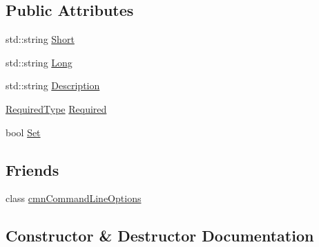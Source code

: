\subsection*{Public Attributes}
\begin{DoxyCompactItemize}
\item 
std\+::string \hyperlink{classcmn_command_line_options_1_1_option_base_aa7799a5119c4018ddb5e10eebbde2d16}{Short}
\item 
std\+::string \hyperlink{classcmn_command_line_options_1_1_option_base_a6f6fcf584fda1640ff1197549e1f660c}{Long}
\item 
std\+::string \hyperlink{classcmn_command_line_options_1_1_option_base_a1500f66c5b609aae2148d84503d802f0}{Description}
\item 
\hyperlink{group__cisst_common_gac239a3ca62dd4e3b391824f6f1a97c76}{Required\+Type} \hyperlink{classcmn_command_line_options_1_1_option_base_a053199a52c9a6696fe25af27c0979331}{Required}
\item 
bool \hyperlink{classcmn_command_line_options_1_1_option_base_a1bab794e3d379aabf0daf3edaf4abd54}{Set}
\end{DoxyCompactItemize}
\subsection*{Friends}
\begin{DoxyCompactItemize}
\item 
class \hyperlink{classcmn_command_line_options_1_1_option_base_a18923f23ed3914806f1edf878a64b422}{cmn\+Command\+Line\+Options}
\end{DoxyCompactItemize}


\subsection{Constructor \& Destructor Documentation}
\hypertarget{classcmn_command_line_options_1_1_option_base_ac8abda74a567eea97e393386dd151065}{}
